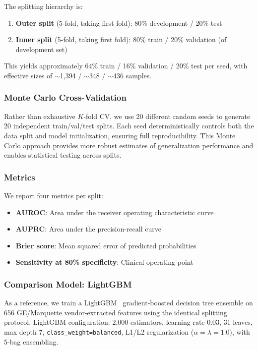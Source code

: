 \documentclass[11pt,a4paper]{article}
\begin{document}
The splitting hierarchy is:
\begin{enumerate}[nosep]
  \item \textbf{Outer split} (5-fold, taking first fold): 80\% development / 20\% test
  \item \textbf{Inner split} (5-fold, taking first fold): 80\% train / 20\% validation (of development set)
\end{enumerate}

This yields approximately 64\% train / 16\% validation / 20\% test per seed, with effective sizes of $\sim$1,394 / $\sim$348 / $\sim$436 samples.

\subsubsection{Monte Carlo Cross-Validation}

Rather than exhaustive $K$-fold CV, we use 20 different random seeds to generate 20 independent train/val/test splits. Each seed deterministically controls both the data split and model initialization, ensuring full reproducibility. This Monte Carlo approach provides more robust estimates of generalization performance and enables statistical testing across splits.

\subsubsection{Metrics}

We report four metrics per split:
\begin{itemize}[nosep]
  \item \textbf{AUROC}: Area under the receiver operating characteristic curve
  \item \textbf{AUPRC}: Area under the precision-recall curve
  \item \textbf{Brier score}: Mean squared error of predicted probabilities
  \item \textbf{Sensitivity at 80\% specificity}: Clinical operating point
\end{itemize}

\subsubsection{Comparison Model: LightGBM}

As a reference, we train a LightGBM~\cite{ke2017} gradient-boosted decision tree ensemble on 656 GE/Marquette vendor-extracted features using the identical splitting protocol. LightGBM configuration: 2,000 estimators, learning rate 0.03, 31 leaves, max depth 7, \texttt{class\_weight=balanced}, L1/L2 regularization ($\alpha{=}\lambda{=}1.0$), with 5-bag ensembling.
\end{document}
